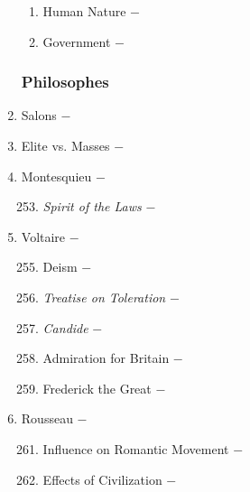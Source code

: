 \documentclass[12pt]{article}
\begin{document}
\begin{enumerate}
\begin{enumerate}[label=\arabic{*}.]
\item Human Nature $-$ 

\item Government $-$

\end{enumerate}
\setcounter{enumi}{249}
\subsubsection{Philosophes}

\item Salons $-$ 

\item Elite vs. Masses $-$

\item Montesquieu $-$ 

\begin{enumerate}[label=\arabic{*}.]
\setcounter{enumii}{252}

\item \textit{Spirit of the Laws} $-$

\end{enumerate}
\setcounter{enumi}{253}

\item Voltaire $-$ 

\begin{enumerate}[label=\arabic{*}.]
\setcounter{enumii}{254}

\item Deism $-$ 

\item \textit{Treatise on Toleration} $-$

\item \textit{Candide} $-$ 

\item Admiration for Britain $-$ 

\item Frederick the Great $-$

\end{enumerate}
\setcounter{enumi}{259}

\item Rousseau $-$ 

\begin{enumerate}[label=\arabic{*}.]
\setcounter{enumii}{260}

\item Influence on Romantic Movement $-$ 

\item Effects of Civilization $-$


\end{enumerate}
\end{enumerate}
\end{document}

